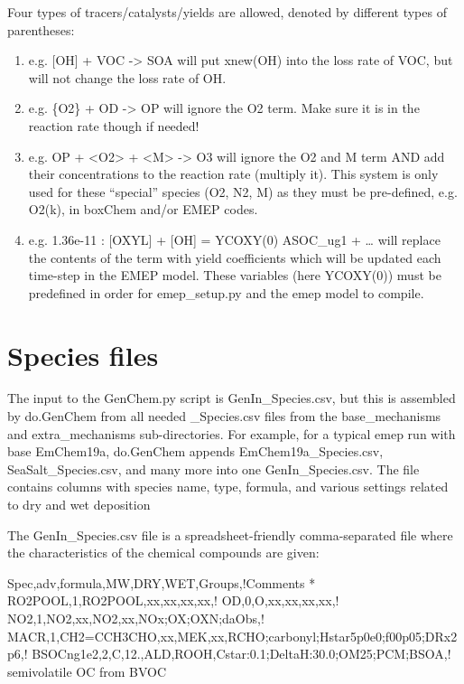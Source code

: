 \documentclass[a4paper,10pt,english]{sphinxmanual}
\begin{document}
Four  types of tracers/catalysts/yields are allowed, denoted by different types of parentheses:
\begin{enumerate}
\def\theenumi{\arabic{enumi}}
\def\labelenumi{\theenumi )}
\makeatletter\def\p@enumii{\p@enumi \theenumi )}\makeatother
\item {} 
e.g. {[}OH{]} + VOC -\textgreater{} SOA   will put xnew(OH) into the loss rate of VOC, but will not change the loss rate of OH.

\item {} 
e.g. \{O2\} + OD -\textgreater{} OP   will ignore the O2 term. Make sure it is in the reaction rate though if needed!

\item {} 
e.g. OP + \textless{}O2\textgreater{} + \textless{}M\textgreater{} -\textgreater{} O3  will ignore the O2 and M term AND add their concentrations to the reaction rate (multiply it). This system is only used for these “special” species (O2, N2, M) as they must be pre-defined, e.g. O2(k), in boxChem and/or EMEP codes.

\item {} 
e.g. 1.36e-11 :   {[}OXYL{]} + {[}OH{]} = \textbar{}YCOXY(0)\textbar{}  ASOC\_ug1  + …  will replace the contents of the \textbar{}\textbar{} term with yield coefficients which will be updated each time-step in the EMEP model.  These variables (here YCOXY(0)) must be predefined in order for emep\_setup.py and the emep model to compile.

\end{enumerate}


\section{Species files}
\label{\detokenize{GenChemDoc_chem:species-files}}
The input to the GenChem.py script is GenIn\_Species.csv, but this
is assembled by do.GenChem from all needed  \_Species.csv files from
the base\_mechanisms and extra\_mechanisms sub-directories. For
example, for a typical emep run with base EmChem19a, do.GenChem
appends EmChem19a\_Species.csv, SeaSalt\_Species.csv, and many more into
one GenIn\_Species.csv. The file contains columns with species
name, type, formula, and various settings related to dry and wet deposition

The GenIn\_Species.csv file is a spreadsheet-friendly comma-separated file
where the characteristics of the chemical compounds are given:

\begin{sphinxVerbatim}[commandchars=\\\{\}]
Spec,adv,formula,MW,DRY,WET,Groups,!Comments
*
RO2POOL,1,RO2POOL,xx,xx,xx,xx,!
OD,0,O,xx,xx,xx,xx,!
NO2,1,NO2,xx,NO2,xx,NOx;OX;OXN;daObs,!
MACR,1,CH2=CCH3CHO,xx,MEK,xx,RCHO;carbonyl;Hstar\PYGZus{}5p0e0;f0\PYGZus{}0p05;DRx\PYGZus{}2p6,!
BSOC\PYGZus{}ng1e2,2,C,12.,ALD,ROOH,Cstar:0.1;DeltaH:30.0;OM25;PCM;BSOA,\PYGZdq{}! semi\PYGZhy{}volatile OC from BVOC \PYGZdq{}
\end{sphinxVerbatim}
\end{document}
